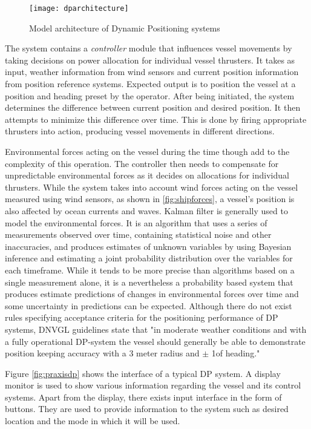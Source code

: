 \begin{figure}
	\centering
	\texttt{[image: dparchitecture]}
	\caption{Model architecture of Dynamic Positioning systems}
	\label{fig:dparchitecture}
\end{figure}


The system contains a \textit{controller} module that influences vessel movements by taking decisions on power allocation for individual vessel thrusters. It takes as input, weather information from wind sensors and current position information from position reference systems. Expected output is to position the vessel at a position and heading preset by the operator. After being initiated, the system determines the difference between current position and desired position. It then attempts to minimize this difference over time. This is done by firing appropriate thrusters into action, producing vessel movements in different directions. 

Environmental forces acting on the vessel during the time though add to the complexity of this operation. The controller then needs to compensate for unpredictable environmental forces as it decides on allocations for individual thrusters.  While the system takes into account wind forces acting on the vessel measured using wind sensors, as shown in \ref{fig:shipforces}, a vessel's position is also affected by ocean currents and waves. Kalman filter is generally used to model the environmental forces. It is an algorithm that uses a series of measurements observed over time, containing statistical noise and other inaccuracies, and produces estimates of unknown variables by using Bayesian inference and estimating a joint probability distribution over the variables for each timeframe. While it tends to be more precise than algorithms based on a single measurement alone, it is a nevertheless a probability based system that produces estimate predictions of changes in environmental forces over time and some uncertainty in predictions can be expected. Although there do not exist rules specifying acceptance criteria for the positioning performance of DP systems, DNVGL guidelines state that "in moderate weather conditions and with a fully operational DP-system the vessel should generally be able to demonstrate position keeping accuracy with a 3 meter radius and $ \pm $ 1\degree of heading." \cite{veritas2011dynamic} 


Figure \ref{fig:praxisdp} shows the interface of a typical DP system. A display monitor is used to show various information regarding the vessel and its control systems. Apart from the display, there exists input interface in the form of buttons. They are used to provide information to the system such as desired location and the mode in which it will be used. 

